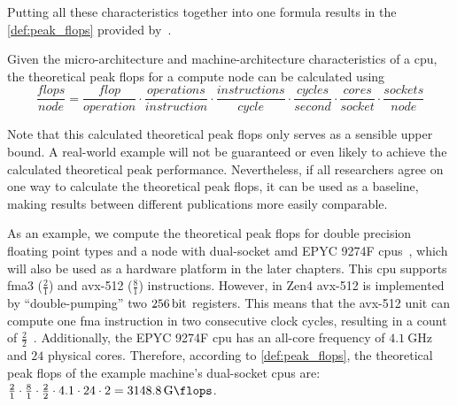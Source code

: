 Putting all these characteristics together into one formula results in the \autoref{def:peak_flops} provided by~\citet{dolbeau_theoretical_2018}.
\begin{definition}\label{def:peak_flops}
Given the micro-architecture and machine-architecture characteristics of a \gls{cpu}, the theoretical peak \acrfull{flops} for a compute node can be calculated using
$$ \frac{flops}{node} = \frac{flop}{operation} \cdot \frac{operations}{instruction} \cdot \frac{instructions}{cycle} \cdot \frac{cycles}{second} \cdot \frac{cores}{socket} \cdot \frac{sockets}{node} $$
\vspace{-1cm}
\end{definition}
Note that this calculated theoretical peak \gls{flops} only serves as a sensible upper bound. 
A real-world example will not be guaranteed or even likely to achieve the calculated theoretical peak performance. 
Nevertheless, if all researchers agree on one way to calculate the theoretical peak \gls{flops}, it can be used as a baseline, making results between different publications more easily comparable. 

As an example, we compute the theoretical peak \gls{flops} for double precision floating point types and a node with dual-socket \gls{amd} EPYC 9274F \glspl{cpu}~\cite{amd_amd_2022}, which will also be used as a hardware platform in the later chapters. 
This \gls{cpu} supports \gls{fma}3 ($\frac{2}{1}$) and \gls{avx}-512 ($\frac{8}{1}$) instructions. 
However, in Zen4 \gls{avx}-512 is implemented by \enquote{double-pumping} two $\SI{256}{\bit}$ registers. 
This means that the \gls{avx}-512 unit can compute one \gls{fma} instruction in two consecutive clock cycles, resulting in a count of $\frac{2}{2}$~\cite{amd_amd_2023}. 
Additionally, the EPYC 9274F \gls{cpu} has an all-core frequency of $\SI{4.1}{\giga\hertz}$ and $\num{24}$ physical cores. 
Therefore, according to \autoref{def:peak_flops}, the theoretical peak \gls{flops} of the example machine's dual-socket \glspl{cpu} are: $\frac{2}{1} \cdot \frac{8}{1} \cdot \frac{2}{2} \cdot 4.1 \cdot 24 \cdot 2 = \SI{3148.8}{\giga\flops}$.

